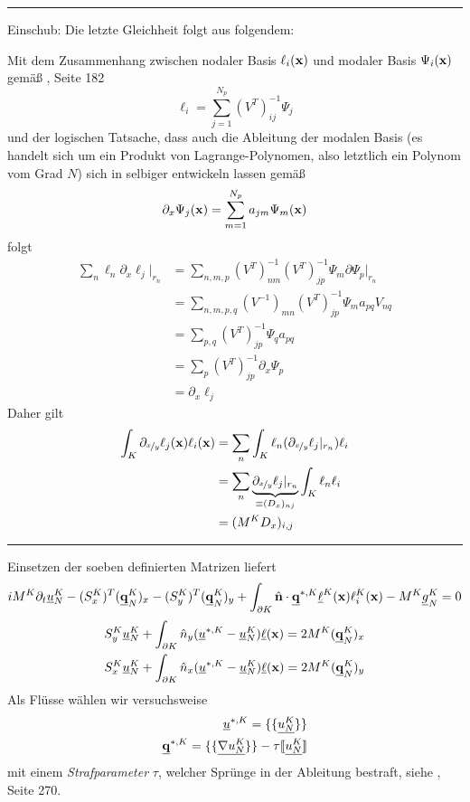 \rule{\textwidth}{0.4pt}
 Einschub: Die letzte Gleichheit folgt aus folgendem:

 Mit dem Zusammenhang zwischen nodaler Basis $\ell_i(\vb{x})$ und modaler Basis $\Psi_i(\vb{x})$ gemäß \cite{buch}, Seite 182
 \begin{equation}
   \ell_i = \sum_{j=1}^{N_p} (V^{T})^{-1}_{ij} \Psi_j
 \end{equation}
 und der logischen Tatsache, dass auch die Ableitung der modalen Basis (es handelt sich um ein Produkt von Lagrange-Polynomen, also letztlich ein Polynom vom Grad $N$) sich in selbiger entwickeln lassen gemäß
 \begin{equation}
   \partial_x \Psi_j(\vb{x}) = \sum_{m=1}^{N_p} a_{jm}\Psi_m(\vb{x})
 \end{equation}
 folgt
 \begin{align*}
   \sum_n \ell_n \partial_x \ell_j |_{r_n} &= \sum_{n,m,p} (V^{T})^{-1}_{nm} (V^{T})^{-1}_{jp}\Psi_m\partial \Psi_p |_{r_n} \\
    &= \sum_{n,m,p,q} (V^{-1})_{mn}(V^{T})^{-1}_{jp} \Psi_m a_{pq} V_{nq}\\
    &= \sum_{p,q}(V^{T})^{-1}_{jp}\Psi_q a_{pq} \\
    &= \sum_p (V^{T})^{-1}_{jp} \partial_x \Psi_p\\
    &= \partial_x \ell_j
 \end{align*}
 Daher gilt
 \begin{align}
   \int_K \partial_{\nicefrac{x}{y}} \ell_j(\vb{x})\ell_i(\vb{x}) &= \sum_n \int_K   \ell_n (\partial_{\nicefrac{x}{y}} \ell_j |_{r_n}) \ell_i \\
   &= \sum_n \underbrace{\partial_{\nicefrac{x}{y}} \ell_j |_{r_n}}_{\equiv (D_x)_{nj}} \int_K \ell_n \ell_i \\
   &= (M^K D_x)_{i,j}
 \end{align}
\rule{\textwidth}{0.4pt}

Einsetzen der soeben definierten Matrizen liefert
\begin{align}
  iM^K\partial_t \underline{u}_N^K - (S^K_x)^T (\underline{\vb{q}}_N^K)_x - (S^K_y)^T (\underline{\vb{q}}_N^K)_y
  + \int_{\partial K}  \hat{\vb{n}} \cdot \underline{\vb{q}}^{*,K} \underline{\ell}^K(\vb{x}) \ell_i^K(\vb{x})
  - M^K\underline{g}_N^K = 0
\end{align}
\begin{align}
  S_y^K \underline{u}^K_N + \int_{\partial K} \hat{n}_{y}  (\underline{u}^{*,K} - \underline{u}_N^K)\underline{\ell}(\vb{x})
  = 2 M^K (\underline{\vb{q}}_N^K)_x \\
  S_x^K \underline{u}^K_N + \int_{\partial K} \hat{n}_{x}  (\underline{u}^{*,K} - \underline{u}_N^K)\underline{\ell}(\vb{x})
  = 2 M^K (\underline{\vb{q}}_N^K)_y
\end{align}
Als Flüsse wählen wir versuchsweise
\begin{align}
  \underline{u}^{*,K} = \{\{ \underline{u_N^K} \}\}\\
  \underline{\vb{q}}^{*,K} = \{\{ \underline{\nabla u_N^K} \}\} - \tau\llbracket \underline{u_N^K} \rrbracket
\end{align}
mit einem \emph{Strafparameter} $\tau$, welcher Sprünge in der Ableitung bestraft, siehe \cite{buch}, Seite 270.



